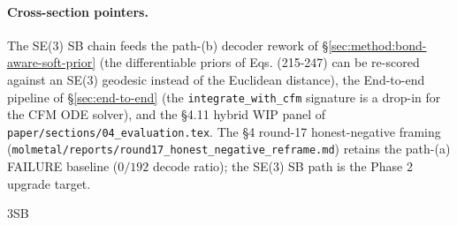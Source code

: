 \paragraph{Cross-section pointers.}
The SE(3) SB chain feeds the path-(b) decoder rework of
\S\ref{sec:method:bond-aware-soft-prior} (the differentiable priors
of Eqs. (215-247) can be re-scored against an SE(3) geodesic
instead of the Euclidean distance), the End-to-end pipeline of
\S\ref{sec:end-to-end} (the \texttt{integrate\_with\_cfm} signature
is a drop-in for the CFM ODE solver), and the §4.11 hybrid WIP
panel of \texttt{paper/sections/04\_evaluation.tex}.  The §4
round-17 honest-negative framing
(\texttt{molmetal/reports/round17\_honest\_negative\_reframe.md})
retains the path-(a) \textsc{FAILURE} baseline ($0/192$ decode
ratio); the SE(3) SB path is the Phase 2 upgrade target.

\makeatletter
\let\cite\WForigCiteSE3SB
\makeatother